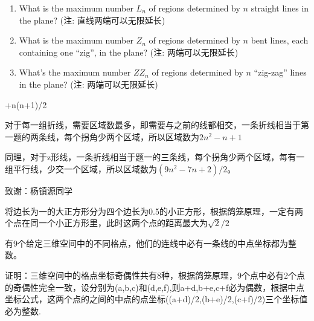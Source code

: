 \documentclass[a4paper, justified]{tufte-handout}
\begin{document}
\begin{problem}
  \begin{enumerate}[(1)]
    \item What is the maximum number $L_n$ of regions 
      determined by $n$ straight lines in the plane?
      (注: 直线两端可以无限延长)
    \item What is the maximum number $Z_n$ of regions 
      determined by $n$ bent lines, each containing one ``zig'', 
      in the plane?
      (注: 两端可以无限延长)
    \item What's the maximum number $ZZ_n$ of regions
      determined by $n$ ``zig-zag'' lines in the plane?
      (注: 两端可以无限延长)
  \end{enumerate}
\end{problem}

\begin{solution}

+n(n+1)/2

对于每一组折线，需要区域数最多，即需要与之前的线都相交，一条折线相当于第一题的两条线，每个拐角少两个区域，所以区域数为$2n^2-n+1$

同理，对于z形线，一条折线相当于题一的三条线，每个拐角少两个区域，每有一组平行线，少交一个区域，所以区域数为$(9n^2-7n+2)/2$。

致谢：杨镇源同学
\end{solution}

\begin{problem}
\end{problem}

\begin{solution}

\quad 将边长为一的大正方形分为四个边长为0.5的小正方形，根据鸽笼原理，一定有两个点在同一个小正方形里，此时这两个点的距离最大为$\sqrt{2}/2$


\end{solution}

\begin{problem}
\end{problem}

\begin{solution}

\quad 有9个给定三维空间中的不同格点，他们的连线中必有一条线的中点坐标都为整数。

证明：三维空间中的格点坐标奇偶性共有8种，根据鸽笼原理，9个点中必有2个点的奇偶性完全一致，设分别为(a,b,c)和(d,e,f),则a+d,b+e,c+f必为偶数，根据中点坐标公式，这两个点的之间的中点的点坐标((a+d)/2,(b+e)/2,(c+f)/2)三个坐标值必为整数.
\end{solution}
\end{document}

